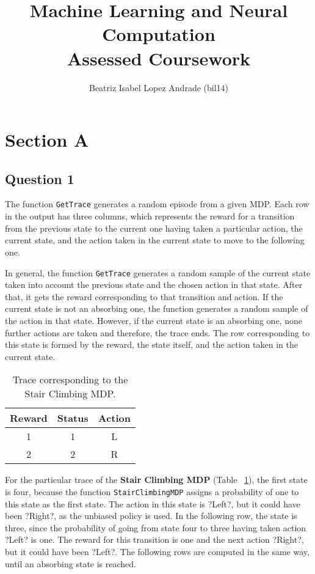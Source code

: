 \documentclass[11pt]{article}   	%
\title{
	Machine Learning and Neural Computation\\
	\textbf{Assessed Coursework}
 }
\author{
	Beatriz Isabel Lopez Andrade (bil14)
}
\begin{document}
\maketitle
\section*{Section A}
\subsection*{Question 1}

The function  \texttt{GetTrace} generates a random episode from a given MDP. Each row in the output has three columns, which represents the reward for a transition from the previous state to the current one having taken a particular action, the current state, and the action taken in the current state to move to the following one.

In general, the function \texttt{GetTrace} generates a random sample of the current state taken into account the previous state and the chosen action in that state. After that, it gets the reward corresponding to that transition and action. If the current state is not an absorbing one, the function generates a random sample of the action in that state. However, if the current state is an absorbing one, none further actions are taken and therefore, the trace ends. The row corresponding to this state is formed by the reward, the state itself, and the action taken in the current state.

\begin{table}[!h] 
	\begin{center}
		\begin{tabular}{ | c c  c | }
		\hline
		Reward & Status & Action \\ \hline \hline
		1 & 1 & L \\ \hline
		2 & 2 & R \\ \hline
		\end{tabular}
		\caption{Trace corresponding to the Stair Climbing MDP.\label{tab:traceStair}}
		
	\end{center}
\end{table}

For the particular trace of the \textbf{Stair Climbing MDP} (Table ~\ref{tab:traceStair}), the first state is four, because the function \texttt{StairClimbingMDP} assigns a probability of one to this state as the first state. The action in this state is ?Left?, but it could have been ?Right?, as the unbiased policy is used. In the following row, the state is three, since the probability of going from state four to three having taken action ?Left? is one. The reward for this transition is one and the next action ?Right?, but it could have been ?Left?. The following rows are computed in the same way, until an absorbing state is reached.
\end{document}
